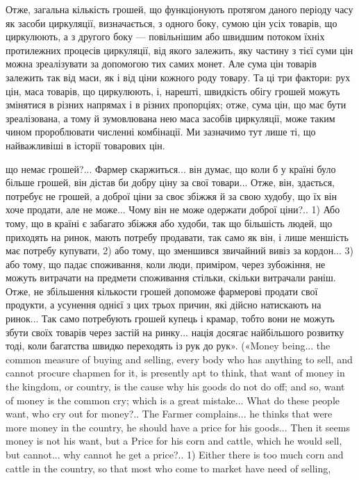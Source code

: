Отже, загальна кількість грошей, що функціонують протягом
даного періоду часу як засоби циркуляції, визначається, з одного
боку, сумою цін усіх товарів, що циркулюють, а з другого боку —
повільнішим або швидшим потоком їхніх протилежних процесів
циркуляції, від якого залежить, яку частину з тієї суми цін можна
зреалізувати за допомогою тих самих монет. Але сума цін товарів
залежить так від маси, як і від ціни кожного роду товару. Та ці
три фактори: рух цін, маса товарів, що циркулюють, і, нарешті,
швидкість обігу грошей можуть змінятися в різних напрямах
і в різних пропорціях; отже, сума цін, що має бути зреалізована,
а тому й зумовлювана нею маса засобів циркуляції, може таким
чином пророблювати численні комбінації. Ми зазначимо тут лише
ті, що найважливіші в історії товарових цін.

що немає грошей?... Фармер скаржиться... він думає, що коли б у країні
було більше грошей, він дістав би добру ціну за свої товари... Отже, він,
здається, потребує не грошей, а доброї ціни за своє збіжжя й за свою худобу,
що їх він хоче продати, але не може... Чому він не може одержати
доброї ціни?.. 1) Або тому, що в країні є забагато збіжжя або худоби,
так що більшість людей, що приходять на ринок, мають потребу продавати,
так само як він, і лише меншість має потребу купувати, 2) або
тому, що зменшився звичайний вивіз за кордон... 3) або тому, що падає
споживання, коли люди, приміром, через зубожіння, не можуть витрачати
на предмети споживання стільки, скільки витрачали раніш. Отже,
не збільшення кількости грошей допоможе фармерові продати свої продукти,
а усунення однієї з цих трьох причин, які дійсно натискають на
ринок... Так само потребують грошей купець і крамар, тобто вони не можуть
збути своїх товарів через застій на ринку... нація досягає найбільшого
розвитку тоді, коли багатства швидко переходять із рук до рук».
(«Money being... the common measure of buying and selling, every body
who has anything to sell, and cannot procure chapmen for it, is presently
apt to think, that want of money in the kingdom, or country, is the cause
why his goods do not do off; and so, want of money is the common cry;
which is a great mistake... What do these people want, who cry out for
money?.. The Farmer complains... he thinks that were more money in the
country, he should have a price for his goods... Then it seems money is not
his want, but a Price for his corn and cattle, which he would sell, but cannot...
why cannot he get a price?.. 1) Either there is too much corn and cattle
in the country, so that most who come to market have need of selling,
